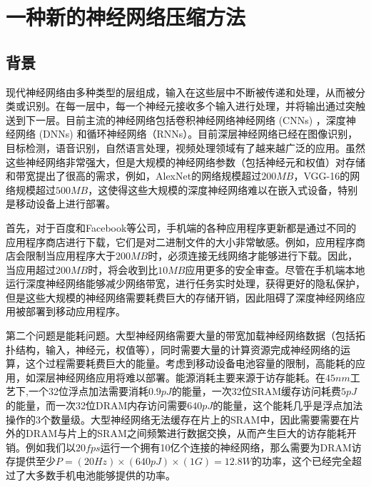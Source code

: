 \chapter{一种新的神经网络压缩方法}

\section{背景}
现代神经网络由多种类型的层组成，输入在这些层中不断被传递和处理，从而被分类或识别。在每一层中，每一个神经元接收多个输入进行处理，并将输出通过突触送到下一层。目前主流的神经网络包括卷积神经网络神经网络 (CNNs) ，深度神经网络 (DNNs) 和循环神经网络（RNNs）。目前深层神经网络已经在图像识别， 目标检测，语音识别，自然语言处理，视频处理领域有了越来越广泛的应用。虽然这些神经网络非常强大，但是大规模的神经网络参数（包括神经元和权值）对存储和带宽提出了很高的需求，例如，AlexNet的网络规模超过$200MB$，VGG-16的网络规模超过$500MB$，这使得这些大规模的深度神经网络难以在嵌入式设备，特别是移动设备上进行部署。

首先，对于百度和Facebook等公司，手机端的各种应用程序更新都是通过不同的应用程序商店进行下载，它们是对二进制文件的大小非常敏感。例如，应用程序商店会限制当应用程序大于$200MB$时，必须连接无线网络才能够进行下载。因此，当应用超过$200MB$时，将会收到比$10MB$应用更多的安全审查。尽管在手机端本地运行深度神经网络能够减少网络带宽，进行任务实时处理，获得更好的隐私保护，但是这些大规模的神经网络需要耗费巨大的存储开销，因此阻碍了深度神经网络应用被部署到移动应用程序。

第二个问题是能耗问题。大型神经网络需要大量的带宽加载神经网络数据（包括拓扑结构，输入，神经元，权值等），同时需要大量的计算资源完成神经网络的运算，这个过程需要耗费巨大的能量。考虑到移动设备电池容量的限制，高能耗的应用，如深层神经网络应用将难以部署。能源消耗主要来源于访存能耗。在$45nm$工艺下,一个32位浮点加法需要消耗$0.9pJ$的能量，一次32位SRAM缓存访问耗费$5pJ$的能量，而一次32位DRAM内存访问需要$640pJ$的能量，这个能耗几乎是浮点加法操作的3个数量级。大型神经网络无法缓存在片上的SRAM中，因此需要需要在片外的DRAM与片上的SRAM之间频繁进行数据交换，从而产生巨大的访存能耗开销。例如我们以$20fps$运行一个拥有10亿个连接的神经网络，那么需要为DRAM访存提供至少$P = (20Hz)\times (640pJ)\times (1G) = 12.8W$的功率，这个已经完全超过了大多数手机电池能够提供的功率。

